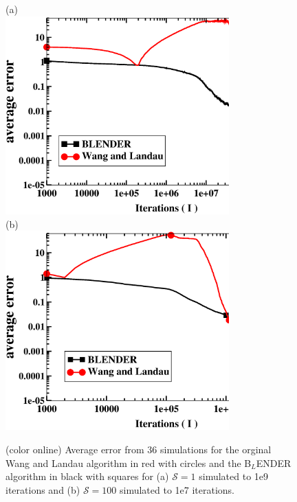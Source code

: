 \documentclass[aps,pre,reprint,superscriptaddress,showkeys]{revtex4-1}
\begin{document}
\begin{figure}[h!]
(a)\\
\includegraphics[width=8.6cm]{fig4a.eps}\\
(b)\\
\includegraphics[width=8.6cm]{fig4b.eps}\\
\caption{(color online) Average error from 36 simulations for the orginal Wang and Landau algorithm in red with circles and the B$_L$ENDER  algorithm in black with squares for (a) $\mathcal{S}=1$ simulated to 1e9 iterations and (b) $\mathcal{S}=100$ simulated to 1e7 iterations. \label{compare_blender_wl}}
\end{figure}
\end{document}
